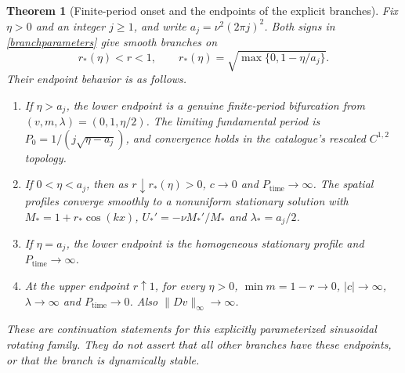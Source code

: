 \documentclass[11pt]{article}
\newtheorem{theorem}{Theorem}
\begin{document}
\begin{theorem}[Finite-period onset and the endpoints of the explicit branches]
\label{explicitcontinuation}
Fix $\eta>0$ and an integer $j\geq1$, and write $a_j=\nu^2(2\pi j)^2$.
Both signs in \eqref{branchparameters} give smooth branches on
\[
 r_*(\eta)<r<1,\qquad
 r_*(\eta)=\sqrt{\max\{0,1-\eta/a_j\}}.
\]
Their endpoint behavior is as follows.
\begin{enumerate}
\item If $\eta>a_j$, the lower endpoint is a genuine finite-period
bifurcation from $(v,m,\lambda)=(0,1,\eta/2)$. The limiting fundamental
period is $P_0=1/(j\sqrt{\eta-a_j})$, and convergence holds in the
catalogue's rescaled $C^{1,2}$ topology.
\item If $0<\eta<a_j$, then as $r\downarrow r_*(\eta)>0$,
$c\to0$ and $P_{\mathrm{time}}\to\infty$. The spatial profiles converge
smoothly to a nonuniform stationary solution with
$M_*=1+r_*\cos(kx)$, $U_*'=-\nu M_*'/M_*$ and
$\lambda_*=a_j/2$.
\item If $\eta=a_j$, the lower endpoint is the homogeneous stationary
profile and $P_{\mathrm{time}}\to\infty$.
\item At the upper endpoint $r\uparrow1$, for every $\eta>0$,
$\min m=1-r\to0$, $|c|\to\infty$, $\lambda\to\infty$ and
$P_{\mathrm{time}}\to0$. Also $\|Dv\|_\infty\to\infty$.
\end{enumerate}
These are continuation statements for this explicitly parameterized
sinusoidal rotating family. They do not assert that all other branches
have these endpoints, or that the branch is dynamically stable.
\end{theorem}
\end{document}
